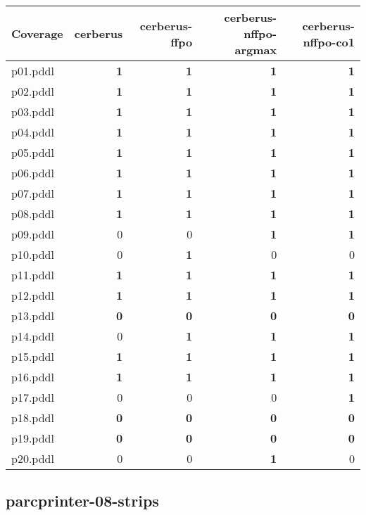 \documentclass{article}
\begin{document}
\begin{tabular}{@{}lrrrr@{}}
Coverage & cerberus & cerberus-ffpo & cerberus-nffpo-argmax & cerberus-nffpo-co1 \\
\midrule
p01.pddl & \textbf{1} & \textbf{1} & \textbf{1} & \textbf{1} \\
p02.pddl & \textbf{1} & \textbf{1} & \textbf{1} & \textbf{1} \\
p03.pddl & \textbf{1} & \textbf{1} & \textbf{1} & \textbf{1} \\
p04.pddl & \textbf{1} & \textbf{1} & \textbf{1} & \textbf{1} \\
p05.pddl & \textbf{1} & \textbf{1} & \textbf{1} & \textbf{1} \\
p06.pddl & \textbf{1} & \textbf{1} & \textbf{1} & \textbf{1} \\
p07.pddl & \textbf{1} & \textbf{1} & \textbf{1} & \textbf{1} \\
p08.pddl & \textbf{1} & \textbf{1} & \textbf{1} & \textbf{1} \\
p09.pddl & 0 & 0 & \textbf{1} & \textbf{1} \\
p10.pddl & 0 & \textbf{1} & 0 & 0 \\
p11.pddl & \textbf{1} & \textbf{1} & \textbf{1} & \textbf{1} \\
p12.pddl & \textbf{1} & \textbf{1} & \textbf{1} & \textbf{1} \\
p13.pddl & \textbf{0} & \textbf{0} & \textbf{0} & \textbf{0} \\
p14.pddl & 0 & \textbf{1} & \textbf{1} & \textbf{1} \\
p15.pddl & \textbf{1} & \textbf{1} & \textbf{1} & \textbf{1} \\
p16.pddl & \textbf{1} & \textbf{1} & \textbf{1} & \textbf{1} \\
p17.pddl & 0 & 0 & 0 & \textbf{1} \\
p18.pddl & \textbf{0} & \textbf{0} & \textbf{0} & \textbf{0} \\
p19.pddl & \textbf{0} & \textbf{0} & \textbf{0} & \textbf{0} \\
p20.pddl & 0 & 0 & \textbf{1} & 0 \\
\end{tabular}

\hypertarget{coverage-parcprinter-08-strips}{}
\subsection*{parcprinter-08-strips}
\end{document}

